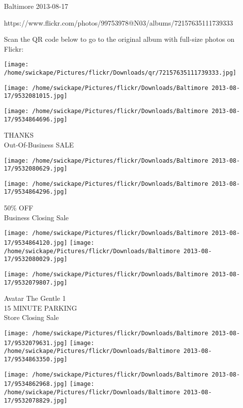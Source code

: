\documentclass[10pt,letterpaper]{article}
\begin{document}
Baltimore 2013-08-17

https://www.flickr.com/photos/99753978@N03/albums/72157635111739333

Scan the QR code below to go to the original album with full-size photos on Flickr:

\texttt{[image: /home/swickape/Pictures/flickr/Downloads/qr/72157635111739333.jpg]}
\pagebreak

\texttt{[image: /home/swickape/Pictures/flickr/Downloads/Baltimore 2013-08-17/9532081015.jpg]}

\vspace{0.25in}
\texttt{[image: /home/swickape/Pictures/flickr/Downloads/Baltimore 2013-08-17/9534864696.jpg]}

THANKS\\
Out{-}Of{-}Business SALE\\
\pagebreak

\texttt{[image: /home/swickape/Pictures/flickr/Downloads/Baltimore 2013-08-17/9532080629.jpg]}

\vspace{0.25in}
\texttt{[image: /home/swickape/Pictures/flickr/Downloads/Baltimore 2013-08-17/9534864296.jpg]}

50\% OFF\\
Business Closing Sale\\
\pagebreak

\texttt{[image: /home/swickape/Pictures/flickr/Downloads/Baltimore 2013-08-17/9534864120.jpg]}
\texttt{[image: /home/swickape/Pictures/flickr/Downloads/Baltimore 2013-08-17/9532080029.jpg]}

\vspace{0.25in}
\texttt{[image: /home/swickape/Pictures/flickr/Downloads/Baltimore 2013-08-17/9532079807.jpg]}

Avatar The Gentle 1\\
15 MINUTE PARKING\\
Store Closing Sale\\
\pagebreak

\texttt{[image: /home/swickape/Pictures/flickr/Downloads/Baltimore 2013-08-17/9532079631.jpg]}
\texttt{[image: /home/swickape/Pictures/flickr/Downloads/Baltimore 2013-08-17/9534863350.jpg]}

\texttt{[image: /home/swickape/Pictures/flickr/Downloads/Baltimore 2013-08-17/9534862968.jpg]}
\texttt{[image: /home/swickape/Pictures/flickr/Downloads/Baltimore 2013-08-17/9532078829.jpg]}
\end{document}
